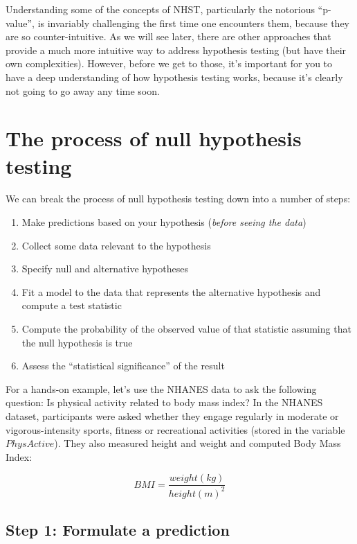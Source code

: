 \documentclass[]{book}
\providecommand{\tightlist}{%
  \setlength{\itemsep}{0pt}\setlength{\parskip}{0pt}}
\theoremstyle{definition}
\theoremstyle{definition}
\theoremstyle{definition}
\theoremstyle{remark}
\begin{document}
Understanding some of the concepts of NHST, particularly the notorious
``p-value'', is invariably challenging the first time one encounters
them, because they are so counter-intuitive. As we will see later, there
are other approaches that provide a much more intuitive way to address
hypothesis testing (but have their own complexities). However, before we
get to those, it's important for you to have a deep understanding of how
hypothesis testing works, because it's clearly not going to go away any
time soon.

\section{The process of null hypothesis
testing}\label{the-process-of-null-hypothesis-testing}

We can break the process of null hypothesis testing down into a number
of steps:

\begin{enumerate}
\def\labelenumi{\arabic{enumi}.}
\tightlist
\item
  Make predictions based on your hypothesis (\emph{before seeing the
  data})
\item
  Collect some data relevant to the hypothesis
\item
  Specify null and alternative hypotheses
\item
  Fit a model to the data that represents the alternative hypothesis and
  compute a test statistic
\item
  Compute the probability of the observed value of that statistic
  assuming that the null hypothesis is true
\item
  Assess the ``statistical significance'' of the result
\end{enumerate}

For a hands-on example, let's use the NHANES data to ask the following
question: Is physical activity related to body mass index? In the NHANES
dataset, participants were asked whether they engage regularly in
moderate or vigorous-intensity sports, fitness or recreational
activities (stored in the variable \(PhysActive\)). They also measured
height and weight and computed Body Mass Index:

\[
BMI = \frac{weight(kg)}{height(m)^2}
\]

\subsection{Step 1: Formulate a
prediction}\label{step-1-formulate-a-prediction}
\end{document}
